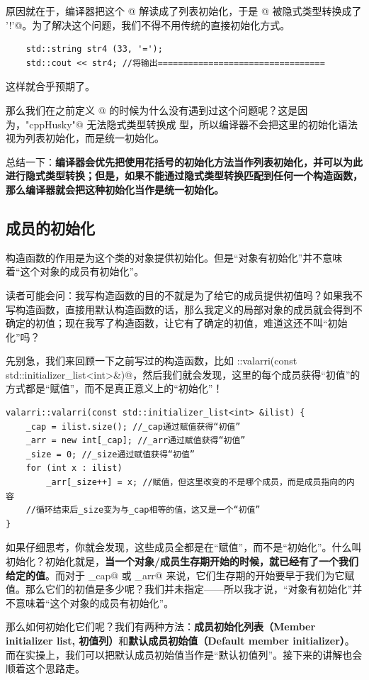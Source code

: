 原因就在于，编译器把这个 @ 解读成了列表初始化，于是 @ 被隐式类型转换成了 \lstinline@'!'@。为了解决这个问题，我们不得不用传统的直接初始化方式。
\begin{lstlisting}
    std::string str4 (33, '=');
    std::cout << str4; //将输出=================================
\end{lstlisting}
这样就合乎预期了。\par
那么我们在之前定义 @ 的时候为什么没有遇到过这个问题呢？这是因为，\lstinline@"cppHusky"@ 无法隐式类型转换成 \lstinline@char@ 型，所以编译器不会把这里的初始化语法视为列表初始化，而是统一初始化。\par
总结一下：\textbf{编译器会优先把使用花括号的初始化方法当作列表初始化，并可以为此进行隐式类型转换；但是，如果不能通过隐式类型转换匹配到任何一个构造函数，那么编译器就会把这种初始化当作是统一初始化。}\par
\subsection*{成员的初始化}
构造函数的作用是为这个类的对象提供初始化。但是``对象有初始化''并不意味着``这个对象的成员有初始化''。\par
读者可能会问：我写构造函数的目的不就是为了给它的成员提供初值吗？如果我不写构造函数，直接用默认构造函数的话，那么我定义的局部对象的成员就会得到不确定的初值；现在我写了构造函数，让它有了确定的初值，难道这还不叫``初始化''吗？\par
先别急，我们来回顾一下之前写过的构造函数，比如 \lstinline@valarri::valarri(const std::initializer_list<int>&)@，然后我们就会发现，这里的每个成员获得``初值''的方式都是``赋值''，而不是真正意义上的``初始化''！
\begin{lstlisting}
valarri::valarri(const std::initializer_list<int> &ilist) {
    _cap = ilist.size(); //_cap通过赋值获得“初值”
    _arr = new int[_cap]; //_arr通过赋值获得“初值”
    _size = 0; //_size通过赋值获得“初值”
    for (int x : ilist)
        _arr[_size++] = x; //赋值，但这里改变的不是哪个成员，而是成员指向的内容
    //循环结束后_size变为与_cap相等的值，这又是一个“初值”
}
\end{lstlisting}
如果仔细思考，你就会发现，这些成员全都是在``赋值''，而不是``初始化''。什么叫初始化？初始化就是，\textbf{当一个对象/成员生存期开始的时候，就已经有了一个我们给定的值}。而对于 \lstinline@_cap@ 或 \lstinline@_arr@ 来说，它们生存期的开始要早于我们为它赋值。那么它们的初值是多少呢？我们并未指定——所以我才说，``对象有初始化''并不意味着``这个对象的成员有初始化''。\par
那么如何初始化它们呢？我们有两种方法：\textbf{成员初始化列表（Member initializer list, 初值列）}和\textbf{默认成员初始值（Default member initializer）}。而在实操上，我们可以把默认成员初始值当作是``默认初值列''。接下来的讲解也会顺着这个思路走。\par
